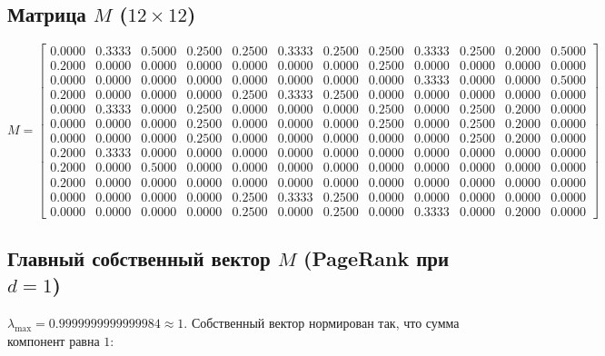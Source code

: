 \documentclass[12pt,a4paper]{article}
\begin{document}
\subsection{Матрица $M$ ($12\times12$)}
\begingroup\footnotesize\setlength{\arraycolsep}{3pt}
\[
M=
\left[\begin{array}{rrrrrrrrrrrr}
0.0000&0.3333&0.5000&0.2500&0.2500&0.3333&0.2500&0.2500&0.3333&0.2500&0.2000&0.5000\\
0.2000&0.0000&0.0000&0.0000&0.0000&0.0000&0.0000&0.2500&0.0000&0.0000&0.0000&0.0000\\
0.0000&0.0000&0.0000&0.0000&0.0000&0.0000&0.0000&0.0000&0.3333&0.0000&0.0000&0.5000\\
0.2000&0.0000&0.0000&0.0000&0.2500&0.3333&0.2500&0.0000&0.0000&0.0000&0.0000&0.0000\\
0.0000&0.3333&0.0000&0.2500&0.0000&0.0000&0.0000&0.2500&0.0000&0.2500&0.2000&0.0000\\
0.0000&0.0000&0.0000&0.2500&0.0000&0.0000&0.0000&0.2500&0.0000&0.2500&0.2000&0.0000\\
0.0000&0.0000&0.0000&0.2500&0.0000&0.0000&0.0000&0.0000&0.0000&0.2500&0.2000&0.0000\\
0.2000&0.3333&0.0000&0.0000&0.0000&0.0000&0.0000&0.0000&0.0000&0.0000&0.0000&0.0000\\
0.2000&0.0000&0.5000&0.0000&0.0000&0.0000&0.0000&0.0000&0.0000&0.0000&0.0000&0.0000\\
0.2000&0.0000&0.0000&0.0000&0.0000&0.0000&0.0000&0.0000&0.0000&0.0000&0.0000&0.0000\\
0.0000&0.0000&0.0000&0.0000&0.2500&0.3333&0.2500&0.0000&0.0000&0.0000&0.0000&0.0000\\
0.0000&0.0000&0.0000&0.0000&0.2500&0.0000&0.2500&0.0000&0.3333&0.0000&0.2000&0.0000
\end{array}\right]
\]
\endgroup

\subsection{Главный собственный вектор $M$ (PageRank при $d=1$)}
$\lambda_{\max}=0.9999999999999984\approx1$. Собственный вектор нормирован так, что сумма компонент равна $1$:
\end{document}
